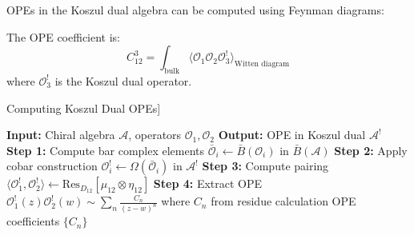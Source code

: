 \begin{technique}\label{tech:diagrams}
OPEs in the Koszul dual algebra can be computed using Feynman diagrams:

\begin{center}
\end{center}

The OPE coefficient is:
$$C_{12}^3 = \int_{\text{bulk}} \langle \mathcal{O}_1 \mathcal{O}_2 \mathcal{O}_3^! \rangle_{\text{Witten diagram}}$$
where $\mathcal{O}_3^!$ is the Koszul dual operator.
\end{technique}

\begin{algorithm}[htbp]
\caption{Computing Koszul Dual OPEs]\label{alg:koszul-ope}}
\begin{algorithmic}[1]
\State \textbf{Input:} Chiral algebra $\mathcal{A}$, operators $\mathcal{O}_1, \mathcal{O}_2$
\State \textbf{Output:} OPE in Koszul dual $\mathcal{A}^!$
\State
\State \textbf{Step 1:} Compute bar complex elements
\State $\bar{\mathcal{O}}_i \gets \bar{B}(\mathcal{O}_i)$ in $\bar{B}(\mathcal{A})$
\State
\State \textbf{Step 2:} Apply cobar construction
\State $\mathcal{O}_i^! \gets \Omega(\bar{\mathcal{O}}_i)$ in $\mathcal{A}^!$
\State
\State \textbf{Step 3:} Compute pairing
\State $\langle \mathcal{O}_1^!, \mathcal{O}_2^! \rangle \gets \text{Res}_{D_{12}}[\mu_{12} \otimes \eta_{12}]$
\State
\State \textbf{Step 4:} Extract OPE
\State $\mathcal{O}_1^!(z) \mathcal{O}_2^!(w) \sim \sum_n \frac{C_n}{(z-w)^n}$
\State where $C_n$ from residue calculation
\State
\State \Return OPE coefficients $\{C_n\}$
\end{algorithmic}
\end{algorithm}

